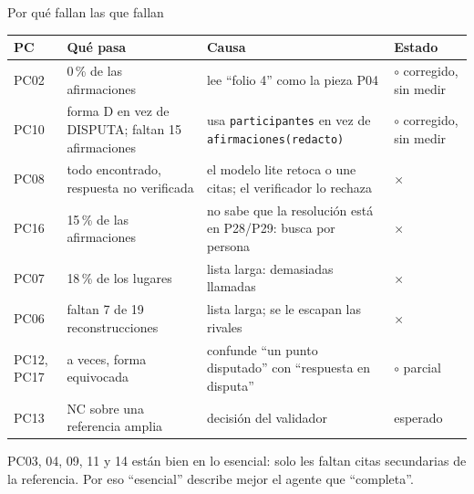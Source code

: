 \documentclass[aspectratio=169,10pt]{beamer}
\newcommand{\ttt}[1]{\texttt{\small #1}}
\newcommand{\no}{\textcolor{rojo}{$\times$}}
\newcommand{\aun}{\textcolor{ambar}{$\circ$}}
\begin{document}
\begin{frame}{Por qué fallan las que fallan}
\scriptsize
\begin{tabular}{@{}lp{3.9cm}p{4.2cm}l@{}}
\toprule
PC & Qué pasa & Causa & Estado \\
\midrule
PC02 & 0\,\% de las afirmaciones & lee \enquote{folio 4} como la pieza P04 & \aun{} corregido, sin medir \\
PC10 & forma D en vez de DISPUTA; faltan 15 afirmaciones & usa \ttt{participantes} en vez de \ttt{afirmaciones(redacto)} & \aun{} corregido, sin medir \\
PC08 & todo encontrado, respuesta \alert{no verificada} & el modelo lite retoca o une citas; el verificador lo rechaza & \no \\
PC16 & 15\,\% de las afirmaciones & no sabe que la resolución está en P28/P29: busca por persona & \no \\
PC07 & 18\,\% de los lugares & lista larga: demasiadas llamadas & \no \\
PC06 & faltan 7 de 19 reconstrucciones & lista larga; se le escapan las rivales & \no \\
PC12, PC17 & a veces, forma equivocada & confunde \enquote{un punto disputado} con \enquote{respuesta en disputa} & \aun{} parcial \\
PC13 & NC sobre una referencia amplia & decisión del validador & esperado \\
\bottomrule
\end{tabular}

\medskip
\footnotesize PC03, 04, 09, 11 y 14 están bien en lo esencial: solo les faltan citas secundarias de la referencia. Por eso
\enquote{esencial} describe mejor el agente que \enquote{completa}.
\end{frame}
\end{document}
